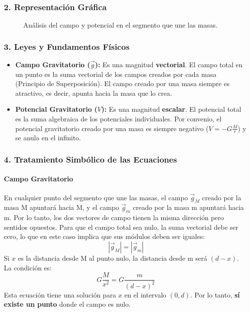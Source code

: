\subsubsection*{2. Representación Gráfica}
\begin{figure}[H]
    \centering
    \caption{Análisis del campo y potencial en el segmento que une las masas.}
\end{figure}

\subsubsection*{3. Leyes y Fundamentos Físicos}
\begin{itemize}
    \item \textbf{Campo Gravitatorio ($\vec{g}$):} Es una magnitud \textbf{vectorial}. El campo total en un punto es la suma vectorial de los campos creados por cada masa (Principio de Superposición). El campo creado por una masa siempre es atractivo, es decir, apunta hacia la masa que lo crea.
    \item \textbf{Potencial Gravitatorio ($V$):} Es una magnitud \textbf{escalar}. El potencial total es la suma algebraica de los potenciales individuales. Por convenio, el potencial gravitatorio creado por una masa es siempre negativo ($V = -G \frac{M}{r}$) y se anula en el infinito.
\end{itemize}

\subsubsection*{4. Tratamiento Simbólico de las Ecuaciones}
\paragraph*{Campo Gravitatorio}
En cualquier punto del segmento que une las masas, el campo $\vec{g}_M$ creado por la masa M apuntará hacia M, y el campo $\vec{g}_m$ creado por la masa m apuntará hacia m. Por lo tanto, los dos vectores de campo tienen la misma dirección pero sentidos opuestos.
Para que el campo total sea nulo, la suma vectorial debe ser cero, lo que en este caso implica que sus módulos deben ser iguales:
$$ |\vec{g}_M| = |\vec{g}_m| $$
Si $x$ es la distancia desde M al punto nulo, la distancia desde m será $(d-x)$. La condición es:
$$ G \frac{M}{x^2} = G \frac{m}{(d-x)^2} $$
Esta ecuación tiene una solución para $x$ en el intervalo $(0, d)$. Por lo tanto, \textbf{sí existe un punto} donde el campo es nulo.

